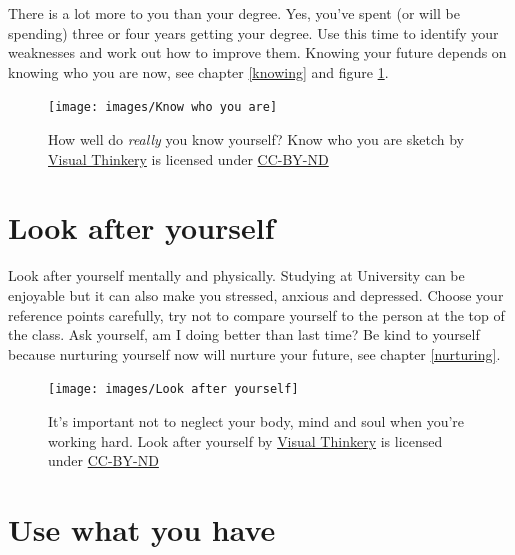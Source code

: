 \documentclass[
]{book}
\begin{document}
There is a lot more to you than your degree. Yes, you've spent (or will be spending) three or four years getting your degree. Use this time to identify your weaknesses and work out how to improve them. Knowing your future depends on knowing who you are now, see chapter \ref{knowing} and figure \ref{fig:knowing-fig}.

\begin{figure}

{\centering \texttt{[image: images/Know who you are]} 

}

\caption{How well do \emph{really} you know yourself? Know who you are sketch by \href{https://visualthinkery.com}{Visual Thinkery} is licensed under \href{https://creativecommons.org/licenses/by-nd/4.0/}{CC-BY-ND}}\label{fig:knowing-fig}
\end{figure}



\hypertarget{onlyhuman}{%
\section{Look after yourself}\label{onlyhuman}}

Look after yourself mentally and physically. Studying at University can be enjoyable but it can also make you stressed, anxious and depressed. Choose your reference points carefully, try not to compare yourself to the person at the top of the class. Ask yourself, am I doing better than last time? Be kind to yourself because nurturing yourself now will nurture your future, see chapter \ref{nurturing}.

\begin{figure}

{\centering \texttt{[image: images/Look after yourself]} 

}

\caption{It's important not to neglect your body, mind and soul when you're working hard. Look after yourself by \href{https://visualthinkery.com}{Visual Thinkery} is licensed under \href{https://creativecommons.org/licenses/by-nd/4.0/}{CC-BY-ND}}\label{fig:lookafter-again-fig}
\end{figure}



\hypertarget{gregwilson}{%
\section{Use what you have}\label{gregwilson}}
\end{document}

